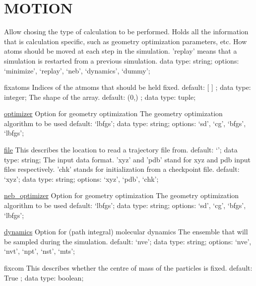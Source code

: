\section{MOTION}
\label{MOTION}
\begin{ipifield}{}%
{Allow chosing the type of calculation to be performed. Holds all the information that is calculation specific, such as geometry optimization parameters, etc.}%
{}%
{%
{How atoms should be moved at each step in the simulation. 'replay' means that a simulation is restarted from a previous simulation.}%
{data type: string; options: `minimize', `replay', `neb', `dynamics', `dummy'; }%
}
\begin{ipifield}{fixatoms}%
{Indices of the atmoms that should be held fixed.}%
{default:  [ ] ; data type: integer; }%
{%
{The shape of the array.}%
{default:  (0,) ; data type: tuple; }%
}
\end{ipifield}
\begin{ipifield}{\hyperref[GEOP]{optimizer}}%
{Option for geometry optimization}%
{}%
{%
{The geometry optimization algorithm to be used}%
{default: `lbfgs'; data type: string; options: `sd', `cg', `bfgs', `lbfgs'; }%
}
\end{ipifield}
\begin{ipifield}{\hyperref[INITFILE]{file}}%
{This describes the location to read a trajectory file from.}%
{default: `'; data type: string; }%
{%
{The input data format. 'xyz' and 'pdb' stand for xyz and pdb input files respectively. 'chk' stands for initialization from a checkpoint file.}%
{default: `xyz'; data type: string; options: `xyz', `pdb', `chk'; }%
}
\end{ipifield}
\begin{ipifield}{\hyperref[GEOP]{neb\_optimizer}}%
{Option for geometry optimization}%
{}%
{%
{The geometry optimization algorithm to be used}%
{default: `lbfgs'; data type: string; options: `sd', `cg', `bfgs', `lbfgs'; }%
}
\end{ipifield}
\begin{ipifield}{\hyperref[DYNAMICS]{dynamics}}%
{Option for (path integral) molecular dynamics}%
{}%
{%
{The ensemble that will be sampled during the simulation. }%
{default: `nve'; data type: string; options: `nve', `nvt', `npt', `nst', `mts'; }%
}
\end{ipifield}
\begin{ipifield}{fixcom}%
{This describes whether the centre of mass of the particles is fixed.}%
{default:  True ; data type: boolean; }%
{}
\end{ipifield}
\end{ipifield}
